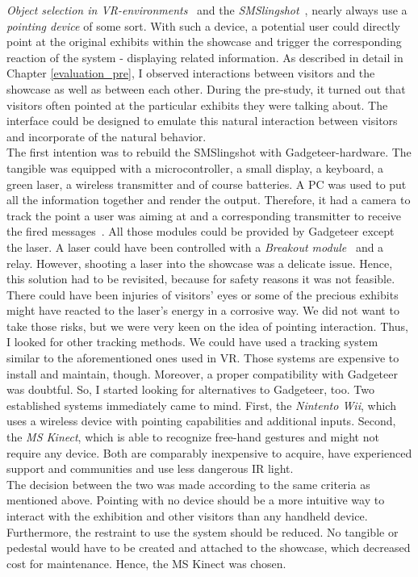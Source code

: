 \textit{Object selection in \ac{VR}-environments}~\cite{VRObjectSelectionCnG} and the \textit{SMSlingshot}~\cite{SMSlingshot}, nearly always use a \textit{pointing device} of some sort. With such a device, a potential user could directly point at the original exhibits within the showcase and trigger the corresponding reaction of the system - displaying related information. As described in detail in Chapter \ref{evaluation_pre}, I observed interactions between visitors and the showcase as well as between each other. During the pre-study, it turned out that visitors often pointed at the particular exhibits they were talking about. The interface could be designed to emulate this natural interaction between visitors and incorporate of the natural behavior.
\\
The first intention was to rebuild the SMSlingshot with Gadgeteer-hardware. The tangible was equipped with a microcontroller, a small display, a keyboard, a green laser, a wireless transmitter and of course batteries. A PC was used to put all the information together and render the output. Therefore, it had a camera to track the point a user was aiming at and a corresponding transmitter to receive the fired messages~\cite{SMSlingshot}. All those modules could be provided by Gadgeteer except the laser. A laser could have been controlled with a \textit{Breakout module}~\cite{BreakoutGHI} and a relay. However, shooting a laser into the showcase was a delicate issue. Hence, this solution had to be revisited, because for safety reasons it was not feasible. There could have been injuries of visitors' eyes or some of the precious exhibits might have reacted to the laser's energy in a corrosive way. We did not want to take those risks, but we were very keen on the idea of pointing interaction. Thus, I looked for other tracking methods. We could have used a tracking system similar to the aforementioned ones used in \ac{VR}. Those systems are expensive to install and maintain, though. Moreover, a proper compatibility with Gadgeteer was doubtful. So, I started looking for alternatives to Gadgeteer, too. Two established systems immediately came to mind. First, the \textit{Nintento Wii}, which uses a wireless device with pointing capabilities and additional inputs. Second, the \textit{\ac{MS} Kinect}, which is able to recognize free-hand gestures and might not require any device. Both are comparably inexpensive to acquire, have experienced support and communities and use less dangerous \ac{IR} light.
\\
The decision between the two was made according to the same criteria as mentioned above. Pointing with no device should be a more intuitive way to interact with the exhibition and other visitors than any handheld device. Furthermore, the restraint to use the system should be reduced. No tangible or pedestal would have to be created and attached to the showcase, which decreased cost for maintenance. Hence, the \ac{MS} Kinect was chosen.
